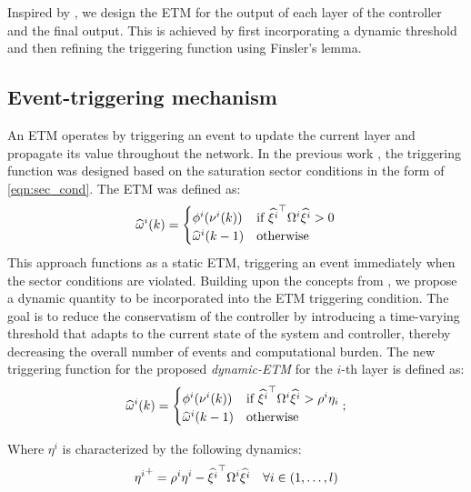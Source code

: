 \documentclass{ifacconf}
\theoremstyle{plain}
\begin{document}
Inspired by \citep[Proposition 1, Lemma 3]{css-extended}, we design the ETM for the output of each layer of the controller and the final output. This is achieved by first incorporating a dynamic threshold and then refining the triggering function using Finsler's lemma.

\subsection{Event-triggering mechanism}
An ETM operates by triggering an event to update the current layer and propagate its value throughout the network. In the previous work \cite{css-extended}, the triggering function was designed based on the saturation sector conditions in the form of \eqref{eqn:sec_cond}. The ETM was defined as:
\begin{equation}
  \widehat{\omega}^{i}(k) = \begin{cases}
    \phi^i(\nu^i(k)) & \text{if } {\widehat{\xi^i}}^\top \Omega^i \widehat{\xi^i} > 0\\
    \widehat{\omega}^{i}(k-1) & \text{otherwise}
  \end{cases}
\end{equation}
This approach functions as a static ETM, triggering an event immediately when the sector conditions are violated. Building upon the concepts from \cite{data-driven}, we propose a dynamic quantity to be incorporated into the ETM triggering condition. The goal is to reduce the conservatism of the controller by introducing a time-varying threshold that adapts to the current state of the system and controller, thereby decreasing the overall number of events and computational burden. The new triggering function for the proposed \emph{dynamic-ETM} for the $i$-th layer is defined as:
\begin{equation}\label{eqn:dynamic_trig}
  \widehat{\omega}^{i}(k) = \begin{cases}
    \phi^i(\nu^i(k)) & \text{if } {\widehat{\xi^i}}^\top \Omega^i \widehat{\xi^i} > \rho^i \eta_i\\
    \widehat{\omega}^{i}(k-1) & \text{otherwise}
  \end{cases};
\end{equation}

Where $\eta^i$ is characterized by the following dynamics:
\begin{equation}\label{eqn:eta_dynamics}
  {\eta^i}^+ = \rho^i \eta^i - {\widehat{\xi^i}}^\top \Omega^i \widehat{\xi^i}\quad  \forall i \in \left( 1, \dots, l \right) 
\end{equation}
\end{document}
